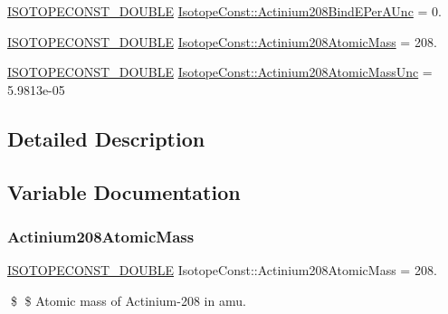\begin{DoxyCompactItemize}
\mbox{\hyperlink{group___isotope_const-_macros_ga8f45a7272ce02c0b4c65c44636ed719a}{I\+S\+O\+T\+O\+P\+E\+C\+O\+N\+S\+T\+\_\+\+D\+O\+U\+B\+LE}} \mbox{\hyperlink{group___isotope_const-_actinium-_ac208_ga8ec5e2c6689b5235ad08d5b581298c43}{Isotope\+Const\+::\+Actinium208\+Bind\+E\+Per\+A\+Unc}} = 0.
\item 
\mbox{\hyperlink{group___isotope_const-_macros_ga8f45a7272ce02c0b4c65c44636ed719a}{I\+S\+O\+T\+O\+P\+E\+C\+O\+N\+S\+T\+\_\+\+D\+O\+U\+B\+LE}} \mbox{\hyperlink{group___isotope_const-_actinium-_ac208_ga092487e586f468976fbcfa071941cdaa}{Isotope\+Const\+::\+Actinium208\+Atomic\+Mass}} = 208.
\item 
\mbox{\hyperlink{group___isotope_const-_macros_ga8f45a7272ce02c0b4c65c44636ed719a}{I\+S\+O\+T\+O\+P\+E\+C\+O\+N\+S\+T\+\_\+\+D\+O\+U\+B\+LE}} \mbox{\hyperlink{group___isotope_const-_actinium-_ac208_ga185c734351d2f0da27ec85a265c3dcee}{Isotope\+Const\+::\+Actinium208\+Atomic\+Mass\+Unc}} = 5.\+9813e-\/05
\end{DoxyCompactItemize}


\subsection{Detailed Description}


\subsection{Variable Documentation}
\mbox{\label{group___isotope_const-_actinium-_ac208_ga092487e586f468976fbcfa071941cdaa}} 
\subsubsection{\texorpdfstring{Actinium208\+Atomic\+Mass}{Actinium208AtomicMass}}
{\footnotesize\ttfamily \mbox{\hyperlink{group___isotope_const-_macros_ga8f45a7272ce02c0b4c65c44636ed719a}{I\+S\+O\+T\+O\+P\+E\+C\+O\+N\+S\+T\+\_\+\+D\+O\+U\+B\+LE}} Isotope\+Const\+::\+Actinium208\+Atomic\+Mass = 208.}

\$ \$ Atomic mass of Actinium-\/208 in amu. \mbox{\label{group___isotope_const-_actinium-_ac208_ga185c734351d2f0da27ec85a265c3dcee}} 
